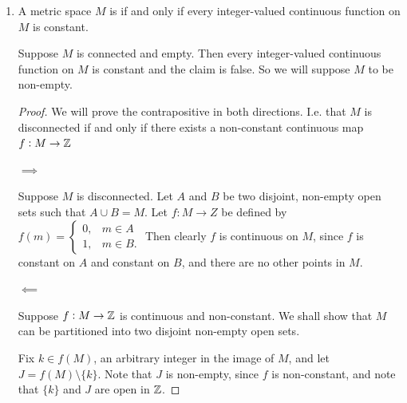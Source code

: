 \documentclass[12pt]{article}
\begin{document}
\begin{enumerate}[label=(\roman*)]
\item
  \begin{claim*}
    A metric space $M$ is  if and only if every integer-valued continuous function
    on $M$ is constant.
  \end{claim*}
  \begin{remark*}
    Suppose $M$ is connected and empty. Then every integer-valued continuous function on $M$ is
    constant and the claim is false. So we will suppose $M$ to be non-empty.
  \end{remark*}
  \begin{proof}

    We will prove the contrapositive in both directions. I.e. that $M$ is disconnected if and only
    if there exists a non-constant continuous map $f:M \to \mathbb{Z}$

    $\implies$

    Suppose $M$ is disconnected. Let $A$ and $B$ be two disjoint, non-empty open sets such that
    $A \cup B = M$. Let $f:M \to Z$ be defined by $f(m) =
    \begin{cases}
      0, & m \in A\\
      1, & m \in B.
    \end{cases}$ Then clearly $f$ is continuous on $M$, since $f$ is constant on $A$ and constant
    on $B$, and there are no other points in $M$.

    $\impliedby$

    Suppose $f:M \to \mathbb{Z}$ is continuous and non-constant. We shall show that $M$ can be partitioned
    into two disjoint non-empty open sets.

    Fix $k \in f(M)$, an arbitrary integer in the image of $M$, and let $J = f(M) \setminus
    \{k\}$. Note that $J$ is non-empty, since $f$ is non-constant, and note that $\{k\}$ and $J$
    are open in $\mathbb{Z}$.


\end{proof}
\end{enumerate}
\end{document}
